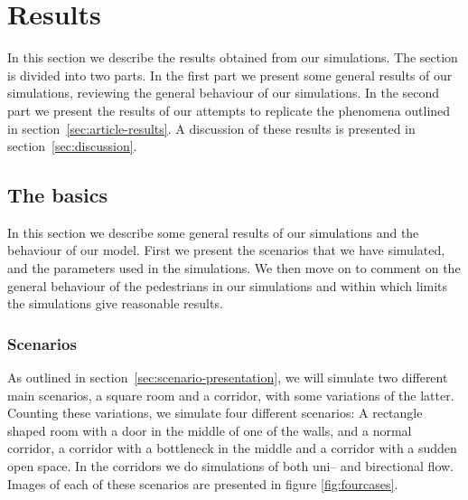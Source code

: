 \section{Results}
\label{sec:results}
In this section we describe the results obtained from our simulations.  The 
section is divided into two parts. In the first part we present some general 
results of our simulations, reviewing the general behaviour of our 
simulations. In the second part we present the results of our attempts to 
replicate the phenomena outlined in section~\ref{sec:article-results}. A 
discussion of these results is presented in section~\ref{sec:discussion}.

\subsection{The basics}
In this section we describe some general results of our simulations and the 
behaviour of our model. First we present the scenarios that we have simulated, 
and the parameters used in the simulations. We then move on to comment on the 
general behaviour of the pedestrians in our simulations and within which 
limits the simulations give reasonable results.

\subsubsection{Scenarios}
As outlined in section~\ref{sec:scenario-presentation}, we will simulate two 
different main scenarios, a square room and a corridor, with some variations 
of the latter. Counting these variations, we simulate four different 
scenarios: A rectangle shaped room with a door in the middle of one of the 
walls, and a normal corridor, a corridor with a bottleneck in the middle and a 
corridor with a sudden open space. In the corridors we do simulations of both 
uni-- and birectional flow. Images of each of these scenarios are presented in 
figure \ref{fig:fourcases}.

